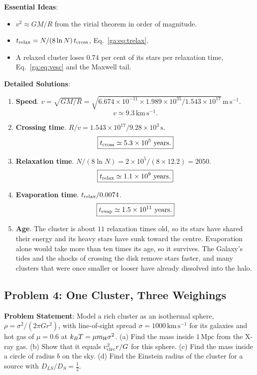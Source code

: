 \textbf{Essential Ideas}:
\begin{itemize}
	\item $v^2\approx GM/R$ from the virial theorem in order of magnitude.
	\item $t_{\rm relax}=N/(8\ln N)\,t_{\rm cross}$, Eq.~\eqref{ga:eq:trelax}.
	\item A relaxed cluster loses $0.74$ per cent of its stars per relaxation time, Eq.~\eqref{ga:eq:vesc} and the Maxwell tail.
\end{itemize}

\textbf{Detailed Solutions}:
\begin{enumerate}[label=(\alph*)]
	\item \textbf{Speed}. $v=\sqrt{GM/R}=\sqrt{6.674\times10^{-11}\times1.989\times10^{35}/1.543\times10^{17}}\,\mathrm{m\,s^{-1}}$.
	\[
	\boxed{v\simeq9.3\,\mathrm{km\,s^{-1}}.}
	\]
	\item \textbf{Crossing time}. $R/v=1.543\times10^{17}/9.28\times10^3\,\mathrm s$.
	\[
	\boxed{t_{\rm cross}\simeq5.3\times10^5\ \text{years}.}
	\]
	\item \textbf{Relaxation time}. $N/(8\ln N)=2\times10^5/(8\times12.2)=2050$.
	\[
	\boxed{t_{\rm relax}\simeq1.1\times10^9\ \text{years}.}
	\]
	\item \textbf{Evaporation time}. $t_{\rm relax}/0.0074$.
	\[
	\boxed{t_{\rm evap}\simeq1.5\times10^{11}\ \text{years}.}
	\]
	\item \textbf{Age}. The cluster is about $11$ relaxation times old, so its stars have shared their energy and its heavy stars have sunk toward the centre. Evaporation alone would take more than ten times its age, so it survives. The Galaxy's tides and the shocks of crossing the disk remove stars faster, and many clusters that were once smaller or looser have already dissolved into the halo.
\end{enumerate}

\subsection{Problem 4: One Cluster, Three Weighings}
\label{ga:prob:cluster3}

\textbf{Problem Statement}: Model a rich cluster as an isothermal sphere, $\rho=\sigma^2/(2\pi Gr^2)$, with line-of-sight spread $\sigma=1000\,\mathrm{km\,s^{-1}}$ for its galaxies and hot gas of $\mu=0.6$ at $k_BT=\mu m_{\rm H}\sigma^2$. (a) Find the mass inside $1\,\mathrm{Mpc}$ from the X-ray gas. (b) Show that it equals $v_{\rm circ}^2r/G$ for this sphere. (c) Find the mass inside a circle of radius $b$ on the sky. (d) Find the Einstein radius of the cluster for a source with $D_{LS}/D_S=\tfrac12$.

